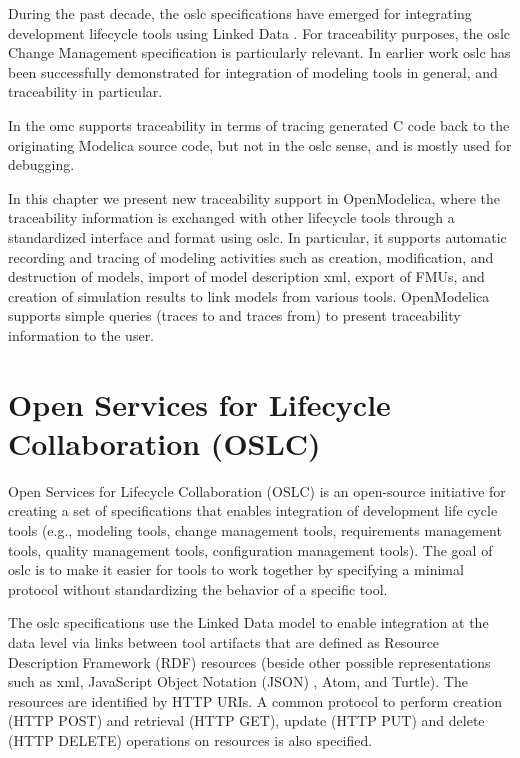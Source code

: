 During the past decade, the \acrshort{oslc} specifications \cite{oslc} have emerged for integrating development lifecycle tools using Linked Data \cite{linkeddatatom,linkeddata,linkeddatatim}. For traceability purposes, the \acrshort{oslc} Change Management specification is particularly relevant. In earlier work \cite{oslcelaasar} \acrshort{oslc} has been successfully demonstrated for integration of modeling tools in general, and traceability in particular. 

In \cite{debugingpop} the \acrshort{omc} supports traceability in terms of tracing generated C code back to the originating Modelica source code, but not in the \acrshort{oslc} sense, and is mostly used for debugging. 

In this chapter we present new traceability support in OpenModelica, where the traceability information is exchanged with other lifecycle 
tools through a standardized interface and format using \acrshort{oslc}. In particular, it supports automatic recording and tracing of
modeling activities such as creation, modification, and destruction of models, import of model description \acrshort{xml}, export of FMUs, and creation of simulation results to link models from various tools. OpenModelica supports simple queries (traces to and traces from) to present traceability information to the user.


\section{Open Services for Lifecycle Collaboration (OSLC)}
\label{sec:tracaebilityoslc}

Open Services for Lifecycle Collaboration (OSLC) \cite{oslc} is an open-source initiative
for creating a set of specifications that enables integration of development life cycle tools (e.g.,
modeling tools, change management tools, requirements management tools, quality management
tools, configuration management tools). The goal of \acrshort{oslc} is to make it easier for tools to work together by
specifying a minimal protocol without standardizing the behavior of a specific tool.

The \acrshort{oslc} specifications use the Linked Data model to enable integration at the data level via links between
tool artifacts that are defined as Resource Description Framework (RDF) \cite{rdffrank} resources (beside other possible representations such as
\acrshort{xml}, JavaScript Object Notation (JSON) \cite{json}, Atom, and Turtle). The resources are identified
by HTTP URIs. A common protocol to perform creation (HTTP POST) and retrieval (HTTP GET), update (HTTP PUT) and delete (HTTP DELETE) operations on resources is also specified.


